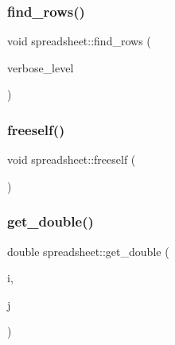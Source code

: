 \mbox{\label{classspreadsheet_aa7ecb515e7ca85800342d643a72d8de6}} 
\subsubsection{\texorpdfstring{find\+\_\+rows()}{find\_rows()}}
{\footnotesize\ttfamily void spreadsheet\+::find\+\_\+rows (\begin{DoxyParamCaption}\item[{\mbox{\hyperlink{galois_8h_a09fddde158a3a20bd2dcadb609de11dc}{I\+NT}}}]{verbose\+\_\+level }\end{DoxyParamCaption})}

\mbox{\label{classspreadsheet_a33d573e9994adb36c53e6ff673db9766}} 
\subsubsection{\texorpdfstring{freeself()}{freeself()}}
{\footnotesize\ttfamily void spreadsheet\+::freeself (\begin{DoxyParamCaption}{ }\end{DoxyParamCaption})}

\mbox{\label{classspreadsheet_ade9efc4ea0410de71199768c266ddeed}} 
\subsubsection{\texorpdfstring{get\+\_\+double()}{get\_double()}}
{\footnotesize\ttfamily double spreadsheet\+::get\+\_\+double (\begin{DoxyParamCaption}\item[{\mbox{\hyperlink{galois_8h_a09fddde158a3a20bd2dcadb609de11dc}{I\+NT}}}]{i,  }\item[{\mbox{\hyperlink{galois_8h_a09fddde158a3a20bd2dcadb609de11dc}{I\+NT}}}]{j }\end{DoxyParamCaption})}

\mbox{\label{classspreadsheet_a422d6b89bbb68079efdc93dd1b6debe9}} 
